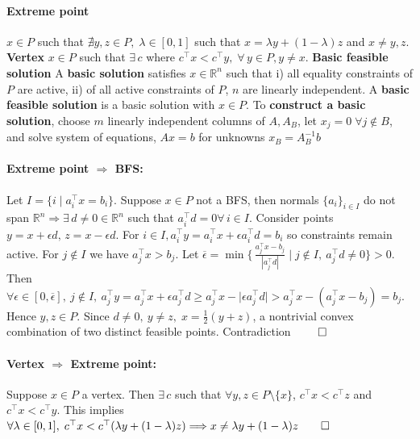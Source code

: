 \documentclass{article}
\newcommand{\abs}[1]{\lvert#1\rvert}
\begin{document}
\paragraph{Extreme point} $x\in P$ such that $\nexists y,z\in P, \; \lambda \in [0,1]$ such that $x = \lambda y + (1 - \lambda)z$ and $x \neq y,z$.
\textbf{Vertex} $x\in P$ such that $\exists\,c$ where $c^\top x < c^\top y, \; \forall\, y\in P, y\neq x$.
\textbf{Basic feasible solution} A \textbf{basic solution} satisfies $x \in \mathbb R^n$ such that i) all equality constraints of $P$ are active, ii) of all active constraints of $P$, $n$ are linearly independent. A \textbf{basic feasible solution} is a basic solution with $x \in P$. To \textbf{construct a basic solution}, choose $m$ linearly independent columns of $A, A_B$, let $x_j = 0\; \forall j \notin B$, and solve system of equations, $Ax = b$ for unknowns $x_B = A_B^{-1}b$

\paragraph{Extreme point $\Rightarrow$ BFS:} Let $I=\{i \mid a_i^\top x = b_i\}$. Suppose $x\in P$ not a BFS, then normals $\{a_i\}_{i\in I}$ do not span $\mathbb R^n \Longrightarrow \exists\, d \neq 0 \in\mathbb R^n$ such that $a_i^\top d = 0 \forall\,i \in I$. 
Consider points $y = x + \epsilon d,\, z=x - \epsilon d$. For $i\in I, a_i^\top y = a_i^\top x + \epsilon a_i^\top d = b_i$ so constraints remain active. For $j\notin I$ we have $a_j^\top x > b_j$. 
Let $\overline \epsilon =  \min\Big\{\,\tfrac{a_j^\top  x-b_j}{\,|a_j^\top  d|\,}\mid j\notin I,\ a_j^\top  d\neq 0\Big\} > 0$.
Then $\forall \epsilon \in [0, \overline \epsilon],\ j \notin I,\ a_j^\top y = a_j^\top x + \epsilon a_j^\top d \geq a_j^\top x - \abs{\epsilon a_j^\top d} > a_j^\top x - (a_j^\top x - b_j) = b_j$. Hence $y,z\in P$. 
Since $d \neq 0,\ y\neq z,\; x = \frac{1}{2}(y + z)$, a nontrivial convex combination of two distinct feasible points. Contradiction $\qed$ 

\paragraph{Vertex $\Rightarrow$ Extreme point:} Suppose $x\in P$ a vertex. Then $\exists\,c$ such that $\forall y,z\in P\setminus\{x\}$, $c^\top x < c^\top z$ and $c^\top x < c^\top y$. This implies $\forall \lambda\in[0,1],\; c^\top x < c^\top (\lambda y + (1 - \lambda)z) \Longrightarrow x \neq  \lambda y + (1 - \lambda)z \qed$
\end{document}
